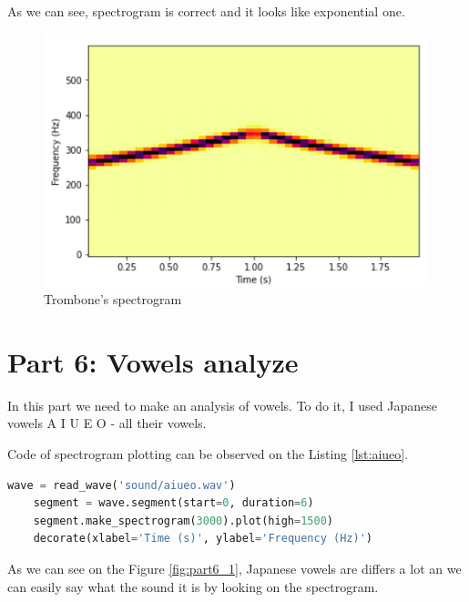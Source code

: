 \documentclass[a4paper]{article}
\begin{document}
            As we can see, spectrogram is correct and it looks like exponential one.
            
            \begin{figure}[H]
                \centering
                \includegraphics[width=\textwidth]{img/tromb.png}
                \caption{Trombone's spectrogram}
                \label{fig:part5_1}
            \end{figure}
            
    \newpage
        \section{Part 6: Vowels analyze}
        
            In this part we need to make an analysis of vowels. To do it, I used Japanese vowels A I U E O - all their vowels.
            
            Code of spectrogram plotting can be observed on the Listing \ref{lst:aiueo}.
            
                        \begin{lstlisting}[language=Python,caption=Signal and spectrum creation,label={lst:aiueo}]
    wave = read_wave('sound/aiueo.wav')
    segment = wave.segment(start=0, duration=6)
    segment.make_spectrogram(3000).plot(high=1500)
    decorate(xlabel='Time (s)', ylabel='Frequency (Hz)')
            \end{lstlisting}
            
            As we can see on the Figure \ref{fig:part6_1}, Japanese vowels are differs a lot an we can easily say what the sound it is by looking on the spectrogram.
            
\end{document}
